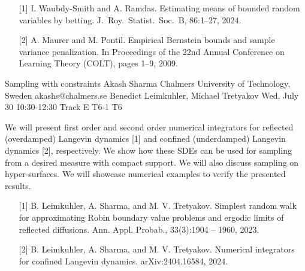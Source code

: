 \begin{talk}
\begin{enumerate}
	\item[{[1]}] I. Waubdy-Smith and A. Ramdas. Estimating means of bounded random
variables by betting. J.\ Roy.\ Statist.\ Soc.\ B, 86:1–27, 2024.
	\item[{[2]}] A. Maurer and M. Pontil. Empirical Bernstein bounds and sample variance penalization. In Proceedings of the 22nd Annual Conference
on Learning Theory (COLT), pages 1–9, 2009.
\end{enumerate}


\end{talk}

\begin{talk}
  {Sampling with constraints}%
  {Akash Sharma}%
  {Chalmers University of Technology, Sweden}%
  {akashs@chalmers.se}%
  {Benedict Leimkuhler, Michael Tretyakov}%
  {}%
  {Wed, July 30 10:30-12:30 Track E}%
  {T6-1}%
  {T6}%
  
				
			
 We will present first order and second order numerical integrators for reflected (overdamped) Langevin dynamics [1] and confined (underdamped) Langevin dynamics [2], respectively. We show how these SDEs can be used for sampling from a desired measure with compact support. We will also discuss sampling on hyper-surfaces. We will showcase numerical examples to verify the presented results.  

\medskip  

\begin{enumerate}
	\item[{[1]}] B. Leimkuhler, A. Sharma, and M. V. Tretyakov. Simplest random walk for approximating Robin boundary
value problems and ergodic limits of reflected diffusions. Ann. Appl. Probab., 33(3):1904 – 1960, 2023.
	\item[{[2]}] B. Leimkuhler, A. Sharma, and M. V. Tretyakov. Numerical integrators for confined Langevin dynamics.  
arXiv:2404.16584, 2024.
\end{enumerate}


\end{talk}

